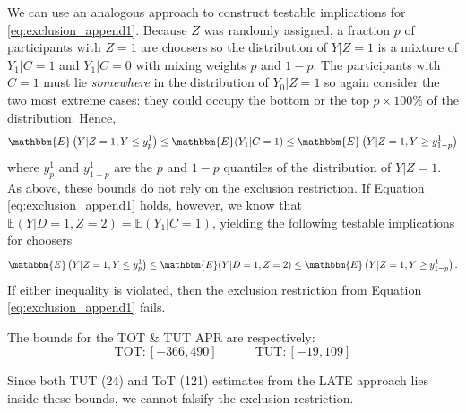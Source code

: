 We can use an analogous approach to construct testable implications for \ref{eq:exclusion_append1}. 
Because $Z$ was randomly assigned, a fraction $p$ of participants with $Z = 1$ are choosers so the distribution of $Y|Z=1$ is a mixture of $Y_1|C=1$ and $Y_1|C=0$ with mixing weights $p$ and $1 -p$.
The participants with $C = 1$ must lie \emph{somewhere} in the distribution of $Y_0|Z=1$ so again consider the two most extreme cases: they could occupy the bottom or the top $p\times 100\%$ of the distribution. 
Hence,
\[
\mathbbm{E}\left(Y|Z=1,Y\leq y^1_{p}\right) \leq \mathbbm{E}(Y_1|C=1) \leq \mathbbm{E}\left(Y|Z=1,Y \geq y^1_{1-p}\right)
\]
where $y^1_p$ and $y^1_{1-p}$ are the $p$ and $1 - p$ quantiles of the distribution of $Y|Z=1$.
As above, these bounds do not rely on the exclusion restriction.
If Equation \ref{eq:exclusion_append1} holds, however, we know that $\mathbb{E}(Y|D=1,Z=2) = \mathbb{E}(Y_1|C=1)$, yielding the following testable implications for choosers
\begin{equation}
\mathbbm{E}\left(Y|Z=1,Y\leq y^1_{p}\right) \leq \mathbbm{E}(Y|D=1,Z=2) \leq \mathbbm{E}\left(Y|Z=1,Y \geq y^1_{1-p}\right).
\label{eq:testable1}
\end{equation}
If either inequality is violated, then the exclusion restriction from Equation \ref{eq:exclusion_append1} fails.

The \cite{huber_mellace} bounds for the TOT \& TUT APR are respectively:
\[\text{TOT} : [-366, 490]\quad\quad\quad\text{TUT} : [-19, 109]\]

Since both TUT (24) and ToT (121) estimates from the LATE approach lies inside these bounds, we cannot falsify the exclusion restriction. 


\newpage






